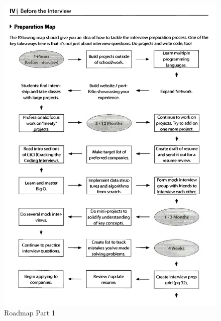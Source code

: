 \begin{figure}[H]
    \centering
    \includegraphics[width=\textwidth]{images/Roadmap 1.png}
    \caption{Roadmap Part 1}
    \label{fig:my_label}
\end{figure}
